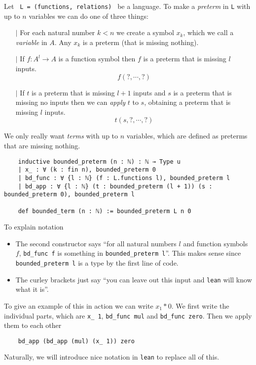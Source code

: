 \begin{dfn}[Terms]
  Let \texttt{ L = (functions, relations) } be a language.
  To make a \textit{preterm} in \texttt{L} with up to $n$ variables
  we can do one of three things:
  \begin{itemize}
    \item[$\vert$] For each natural number $k < n$ we create a symbol
          $x_{k}$, which we call a \textit{variable} in $A$.
          Any $x_{k}$ is a preterm (that is missing nothing).
    \item[$\vert$] If $f : A^{l} \to A$ is a function symbol then
          $f$ is a preterm that is missing $l$ inputs.
          \[ f( ? , \cdots , ? )\]
    \item[$\vert$] If $t$ is a preterm that is missing
          $l + 1$ inputs and $s$ is a preterm that is missing
          no inputs then we can \textit{apply} $t$ to $s$, obtaining
          a preterm that is missing $l$ inputs.
          \[ t(s , ? , \cdots, ? )\]
  \end{itemize}

  We only really want \textit{terms} with up to $n$ variables,
  which are defined as preterms that are missing nothing.

  \begin{lstlisting}
    inductive bounded_preterm (n : ℕ) : ℕ → Type u
    | x_ : ∀ (k : fin n), bounded_preterm 0
    | bd_func : ∀ {l : ℕ} (f : L.functions l), bounded_preterm l
    | bd_app : ∀ {l : ℕ} (t : bounded_preterm (l + 1)) (s : bounded_preterm 0), bounded_preterm l

    def bounded_term (n : ℕ) := bounded_preterm L n 0\end{lstlisting}

  To explain notation
  \begin{itemize}
    \item The second constructor says ``for all natural numbers $l$ and function symbols $f$,
          \texttt{bd\_func f} is something in \texttt{bounded\_preterm l}''.
          This makes sense since \texttt{bounded\_preterm l} is a type by the first line of code.
    \item The curley brackets just say
          ``you can leave out this input and \texttt{lean} will know what it is''.
  \end{itemize}

  To give an example of this in action we can write $x_{1} * 0$.
  We first write the individual parts, which are
  \texttt{x\_ 1}, \texttt{bd\_func mul} and
  \texttt{bd\_func zero}.
  Then we apply them to each other
  \begin{lstlisting}
    bd_app (bd_app (mul) (x_ 1)) zero \end{lstlisting}
  Naturally, we will introduce nice notation in \texttt{lean} to replace all of this.
\end{dfn}

